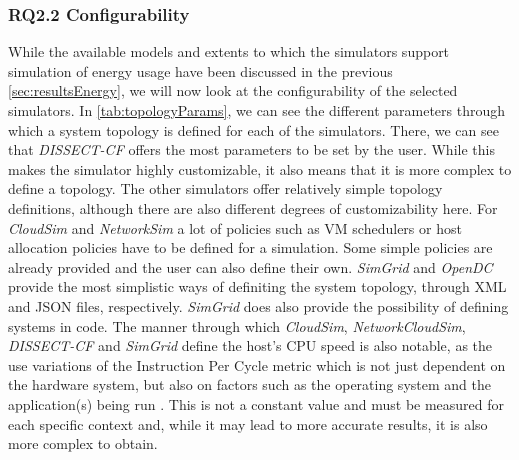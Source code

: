 \subsubsection{RQ2.2 Configurability}
While the available models and extents to which the simulators support simulation of energy usage have been discussed in the previous \autoref{sec:resultsEnergy}, we will now look at the configurability of the selected simulators. In \autoref{tab:topologyParams}, we can see the different parameters through which a system topology is defined for each of the simulators. There, we can see that \textit{DISSECT-CF} offers the most parameters to be set by the user. While this makes the simulator highly customizable, it also means that it is more complex to define a topology. The other simulators offer relatively simple topology definitions, although there are also different degrees of customizability here. For \textit{CloudSim} and \textit{NetworkSim} a lot of policies such as VM schedulers or host allocation policies have to be defined for a simulation. Some simple policies are already provided and the user can also define their own. \textit{SimGrid} and \textit{OpenDC} provide the most simplistic ways of definiting the system topology, through XML and JSON files, respectively. \textit{SimGrid} does also provide the possibility of defining systems in code. The manner through which \textit{CloudSim}, \textit{NetworkCloudSim}, \textit{DISSECT-CF} and \textit{SimGrid} define the host's CPU speed is also notable, as the use variations of the Instruction Per Cycle metric which is not just dependent on the hardware system, but also on factors such as the operating system and the application(s) being run \cite{patterson_parallelism_2013}. This is not a constant value and must be measured for each specific context and, while it may lead to more accurate results, it is also more complex to obtain.

